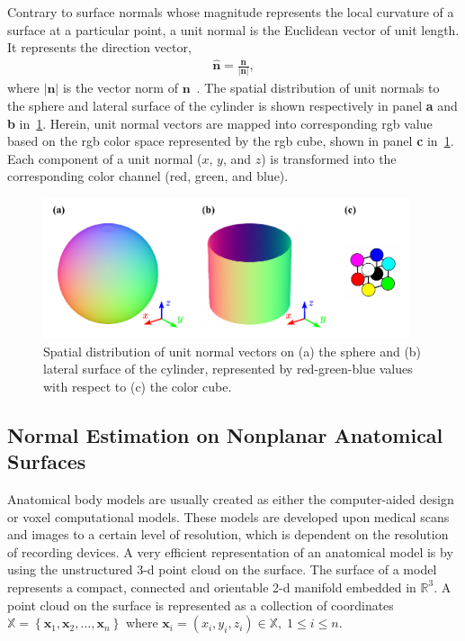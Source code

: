 Contrary to surface normals whose magnitude represents the local curvature of a surface at a particular point, a unit normal is the Euclidean vector of unit length.
It represents the direction vector,
\begin{align}
    \mathbf{\hat n} = \frac{\mathbf{n}}{\left| \mathbf{n} \right|},
\end{align}
where $\left| \mathbf{n} \right|$ is the vector norm of $\mathbf{n}$~\cite{Weisstein2023Unit}.
The spatial distribution of unit normals to the sphere and lateral surface of the cylinder is shown respectively in panel \textbf{a} and \textbf{b} in~\cref{fig:normals}.
Herein, unit normal vectors are mapped into corresponding \gls{rgb} value based on the \gls{rgb} color space represented by the \gls{rgb} cube, shown in panel \textbf{c} in~\cref{fig:normals}.
Each component of a unit normal ($x$, $y$, and $z$) is transformed into the corresponding color channel (red, green, and blue).
\begin{figure}[t]
    \centering
    \includegraphics[width=0.96\textwidth]{artwork/normals.pdf}
    \caption{Spatial distribution of unit normal vectors on (a) the sphere and (b) lateral surface of the cylinder, represented by red-green-blue values with respect to (c) the color cube.}
    \label{fig:normals}
\end{figure}

\subsection{Normal Estimation on Nonplanar Anatomical Surfaces}
Anatomical body models are usually created as either the computer-aided design or voxel computational models.
These models are developed upon medical scans and images to a certain level of resolution, which is dependent on the resolution of recording devices.
A very efficient representation of an anatomical model is by using the unstructured \gls{3-d} point cloud on the surface.
The surface of a model represents a compact, connected and orientable \gls{2-d} manifold embedded in $\mathbb{R}^3$.
A point cloud on the surface is represented as a collection of coordinates $\mathbb{X} = \left\{ \mathbf{x}_1, \mathbf{x}_2, \dots, \mathbf{x}_n \right\}$ where $\mathbf{x}_i = (x_i, y_i, z_i) \in \mathbb{X}, \; 1 \leq i \leq n$.

